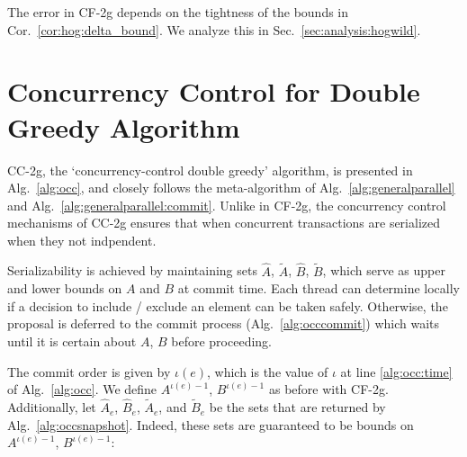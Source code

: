 \documentclass{article} %
\makeatletter
\newcommand{\hogwild}{CF-2g}
\newcommand{\occ}{CC-2g}
\newcommand{\Comments}{1}
\newcommand{\note}[2]{\ifnum\Comments=1\textcolor{#1}{#2}\fi}
\newcommand{\xinghao}[1]{\note{red}{[XP: #1]}}
\newcommand{\secref}[1]{Sec.~\ref{#1}}
\newcommand{\corref}[1]{Cor.~\ref{#1}}
\newcommand{\algref}[1]{Alg.~\ref{#1}}
\newcommand\footnoteref[1]{\protected@xdef\@thefnmark{\ref{#1}}\@footnotemark}
\makeatother
\begin{document}
The error in \hogwild{} depends on the tightness of the bounds in \corref{cor:hog:delta_bound}.
We analyze this in \secref{sec:analysis:hogwild}.











\section{Concurrency Control for Double Greedy Algorithm \label{sec:algocc}}

\occ{}, the `concurrency-control double greedy' algorithm, is presented in \algref{alg:occ}, and closely follows the meta-algorithm of \algref{alg:generalparallel} and \algref{alg:generalparallel:commit}.
Unlike in \hogwild{}, the concurrency control mechanisms of \occ{} ensures that when concurrent transactions are serialized when they not indpendent.

Serializability is achieved by maintaining sets $\hat{A}$, $\tilde{A}$, $\hat{B}$, $\tilde{B}$, which serve as upper and lower bounds on $A$ and $B$ at commit time.
Each thread can determine locally if a decision to include / exclude an element can be taken safely.
Otherwise, the proposal is deferred to the commit process (\algref{alg:occcommit}) which waits until it is certain about $A$, $B$ before proceeding.

The commit order is given by $\iota(e)$, which is the value of $\iota$ at line \ref{alg:occ:time} of \algref{alg:occ}.
We define $A^{\iota(e)-1}$, $B^{\iota(e)-1}$ as before with \hogwild{}.
Additionally, let $\hat{A}_e$, $\hat{B}_e$, $\tilde{A}_e$, and $\tilde{B}_e$ be the sets that are returned by \algref{alg:occsnapshot}\footnoteref{fn:copyvsshared}.
Indeed, these sets are guaranteed to be bounds on $A^{\iota(e)-1}$, $B^{\iota(e)-1}$:
\end{document}
